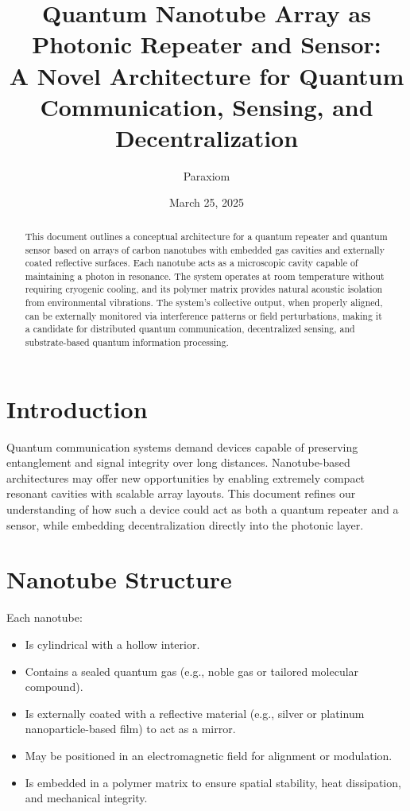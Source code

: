 \documentclass[11pt]{article}
\title{Quantum Nanotube Array as Photonic Repeater and Sensor:\\A Novel Architecture for Quantum Communication, Sensing, and Decentralization}
\author{Paraxiom}
\date{March 25, 2025}
\begin{document}
	
	\maketitle
	
	\begin{abstract}
		This document outlines a conceptual architecture for a quantum repeater and quantum sensor based on arrays of carbon nanotubes with embedded gas cavities and externally coated reflective surfaces. Each nanotube acts as a microscopic cavity capable of maintaining a photon in resonance. The system operates at room temperature without requiring cryogenic cooling, and its polymer matrix provides natural acoustic isolation from environmental vibrations. The system's collective output, when properly aligned, can be externally monitored via interference patterns or field perturbations, making it a candidate for distributed quantum communication, decentralized sensing, and substrate-based quantum information processing.
	\end{abstract}
	
	\section{Introduction}
	Quantum communication systems demand devices capable of preserving entanglement and signal integrity over long distances. Nanotube-based architectures may offer new opportunities by enabling extremely compact resonant cavities with scalable array layouts. This document refines our understanding of how such a device could act as both a quantum repeater and a sensor, while embedding decentralization directly into the photonic layer.
	
	\section{Nanotube Structure}
	Each nanotube:
	\begin{itemize}
		\item Is cylindrical with a hollow interior.
		\item Contains a sealed quantum gas (e.g., noble gas or tailored molecular compound).
		\item Is externally coated with a reflective material (e.g., silver or platinum nanoparticle-based film) to act as a mirror.
		\item May be positioned in an electromagnetic field for alignment or modulation.
		\item Is embedded in a polymer matrix to ensure spatial stability, heat dissipation, and mechanical integrity.
	\end{itemize}
	
\end{document}
